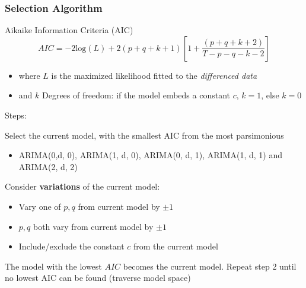 \documentclass{beamer}
\newenvironment{wideenumerate}{\enumerate\addtolength{\itemsep}{10pt}}{\endenumerate}
\begin{document}
\begin{frame}
  \frametitle{Selection Algorithm}
  \begin{alertblock}{Aikaike Information Criteria (AIC)}
    \begin{equation*}
      AIC = -2 \text{log}(L) + 2(p+q+k+1) \left[ 1 + \frac{(p+q+k+2)}{T-p-q-k-2} \right]
    \end{equation*}
    \begin{itemize}
    \item where $L$ is the maximized likelihood fitted to the \emph{differenced data}
    \item and $k$ Degrees of freedom: if the model embeds a constant $c$, $k=1$, else $k=0$
    \end{itemize}    
  \end{alertblock}

  Steps:\\

  \begin{wideenumerate}
  \item Select the current model, with the smallest AIC from the most parsimonious
    \begin{itemize}
    \item ARIMA(0,d, 0), ARIMA(1, d, 0), ARIMA(0, d, 1), ARIMA(1, d, 1) and ARIMA(2, d, 2)
    \end{itemize}
  \item Consider \textbf{variations} of the current model:
    \begin{itemize}
    \item Vary one of $p, q$ from current model by $\pm 1$
    \item $p, q$ both vary from current model by $\pm 1$
    \item Include/exclude the constant $c$ from the current model
    \end{itemize}
  \item The model with the lowest $AIC$ becomes the current model. Repeat step 2 until no lowest AIC can be found (traverse model space)
  \end{wideenumerate}

\end{frame}
\end{document}

